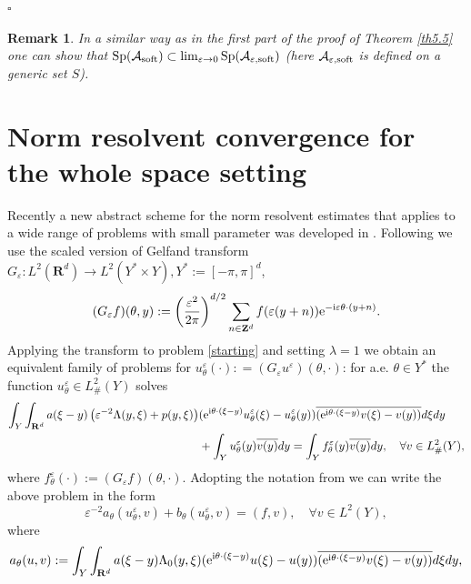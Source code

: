 \documentclass[11pt]{article}
\newcommand\e {\varepsilon}
\newcommand\soft{{\rm soft}}
\def\rme{{\rm e}}
\def\rmi{{\rm i}}
\newcommand{\R}{\mathbf{R}}
\def\AA{\mathcal{A}}
\def\l{\lambda}
\DeclareMathOperator{\Sp}{Sp}
\newcommand\G{G}
\newcommand\Z{\mathbf{Z}}
\newtheorem{remark}[theorem]{Remark}
\theoremstyle{remark}
\begin{document}
	\hfill $\square$

\begin{remark} \label{remvele}
	In a similar way as in the first part of the proof of Theorem \ref{th5.5}  one can show that $\mathrm{Sp}(\AA_\soft) \subset  \lim_{\e \to 0} \Sp (\AA_{\e,\soft})$ (here $\AA_{\e,\soft}$ is defined on a generic set $S$).
	
	
\end{remark}




\section{Norm resolvent convergence for the whole space setting }\label{s7}

Recently a new abstract scheme for the norm resolvent estimates that applies to a wide range of problems with small parameter was developed in \cite{CKS2023}.
Following \cite{CKS2023} we use the scaled version of Gelfand transform $\G_\e: L^2(\R^d) \to L^2(Y^*\times  Y ), Y^*:= [-\pi,\pi]^d $,
\begin{equation*}
	(\G_\e f)(\theta, y) := \left(\frac{\e^2}{2\pi}\right)^{d/2} \sum_{n\in \Z^d} f(\e(y+n)) \rme^{-\rmi  \e \theta\cdot(y+n)}.
\end{equation*}
Applying the transform to problem \eqref{starting} and setting $\l = 1$ we obtain an equivalent family of problems for $u^\e_\theta(\cdot): = 	(\G_\e u^\e)(\theta, \cdot)$: for a.e. $\theta \in Y^*$ the function $u^\e_\theta\in L^2_\#(Y)$ solves
\begin{equation*} %
	\begin{split}
		 \int_{Y}\int_{\R^d} a(\xi - y) \left( \e^{-2}\Lambda(y,\xi) +  p(y,\xi)\right) &(\rme^{\rmi \theta\cdot(\xi - y)} u^\e_\theta(\xi)-u^\e_\theta(y))  \overline{(\rme^{\rmi \theta\cdot(\xi - y)}v(\xi)-v(y))}d\xi dy
		\\
		& +  \int_{Y} u^\e_\theta(y)\overline{v(y)} dy=\int_{Y} f^\e_\theta(y)\overline{v(y)} dy, \quad \forall v\in   L^2_\#(Y),
	\end{split}
\end{equation*}
where $f^\e_\theta(\cdot):=	(\G_\e f)(\theta, \cdot)$.  Adopting the notation from \cite{CKS2023} we can write the above problem in the form
\begin{equation} \label{62}
	\e^{-2} a_\theta(u^\e_\theta,v) + b_\theta(u^\e_\theta,v) = (f,v), \quad \forall v\in   L^2(Y),
\end{equation}
where
\begin{equation*} %
	a_\theta(u,v) : = \int_{Y}\int_{\R^d} a(\xi - y) \Lambda_0(y,\xi) (\rme^{\rmi \theta\cdot(\xi - y)} u(\xi)-u(y))\overline{(\rme^{\rmi \theta\cdot(\xi - y)}v(\xi)-v(y))}d\xi dy,
\end{equation*}
\end{document}
